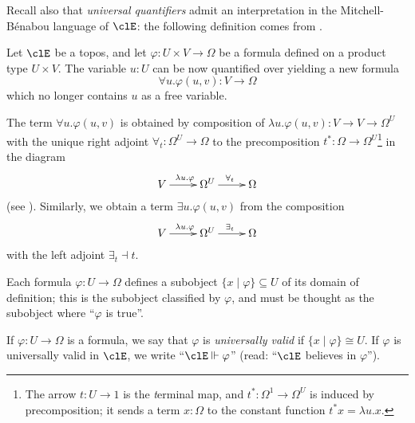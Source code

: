 Recall also that \emph{universal quantifiers} admit an interpretation in the Mitchell-Bénabou language of $\clE$: the following definition comes from \cite[VI]{mac1992sheaves}.
\begin{definition}\label{quantifezzi}
	Let $\clE$ be a topos, and let $\varphi : U\times V \to \Omega$ be a formula defined on a product type $U\times V$. The variable $u:U$ can be now quantified over yielding a new formula
	\[\forall u.\varphi(u,v) : V \to \Omega\]
	which no longer contains $u$ as a free variable.

	The term $\forall u.\varphi(u,v)$ is obtained by composition of $\lambda u.\varphi(u,v) : V \to V\to\Omega^U$ with the unique right adjoint $\forall_t : \Omega^U \to \Omega$ to the precomposition $t^*:\Omega \to \Omega^U$\footnote{The arrow $t:U\to 1$ is the \emph{t}erminal map, and $t^* : \Omega^1\to \Omega^U$ is induced by precomposition; it sends a term $x : \Omega$ to the constant function $t^*x=\lambda u.x$.} in the diagram
	\[\xymatrix{
			V \ar[r]^{\lambda u.\varphi} & \Omega^U \ar[r]^{\forall_t} & \Omega
		}\]
	(see \cite[IV.9]{mac1992sheaves}). Similarly, we obtain a term $\exists u.\varphi(u,v)$ from the composition
	\[\xymatrix{
			V \ar[r]^{\lambda u.\varphi} & \Omega^U \ar[r]^{\exists_t} & \Omega
		}\]
	with the left adjoint $\exists_t \dashv t$.
\end{definition}
Each formula $\varphi : U \to \Omega$ defines a subobject $\{x\mid \varphi\} \subseteq U$ of its domain of definition; this is the subobject classified by $\varphi$, and must be thought as the subobject where ``$\varphi$ is true''.

If $\varphi : U\to\Omega$ is a formula, we say that $\varphi$ is \emph{universally valid} if $\{x\mid\varphi\}\cong U$. If $\varphi$ is universally valid in $\clE$, we write ``$\clE\Vdash \varphi$'' (read: ``$\clE$ believes in $\varphi$'').


